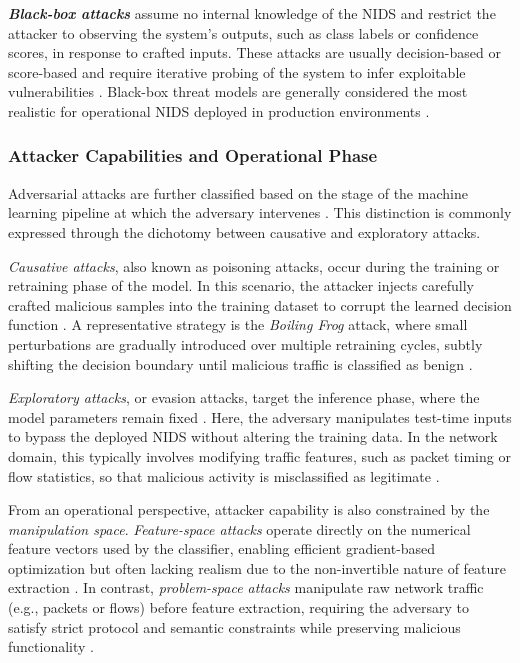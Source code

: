 \textit{\textbf{Black-box attacks}} assume no internal knowledge of the NIDS and restrict the attacker to observing the system's outputs, such as class labels or confidence scores, in response to crafted inputs. These attacks are usually decision-based or score-based and require iterative probing of the system to infer exploitable vulnerabilities \cite{yuan2024simple, zhang2022adversarial}. Black-box threat models are generally considered the most realistic for operational NIDS deployed in production environments \cite{ayub2020model}.

\subsubsection{Attacker Capabilities and Operational Phase}

Adversarial attacks are further classified based on the stage of the machine learning pipeline at which the adversary intervenes \cite{huang2011adversarial}. 
This distinction is commonly expressed through the dichotomy between causative and exploratory attacks.

\textit{Causative attacks}, also known as poisoning attacks, occur during the training or retraining phase of the model. 
In this scenario, the attacker injects carefully crafted malicious samples into the training dataset to corrupt the learned decision function \cite{rubinstein2009antidote}. 
A representative strategy is the \emph{Boiling Frog} attack, where small perturbations are gradually introduced over multiple retraining cycles, subtly shifting the decision boundary until malicious traffic is classified as benign \cite{madani2018robustness}.

\textit{Exploratory attacks}, or evasion attacks, target the inference phase, where the model parameters remain fixed \cite{huang2011adversarial}. 
Here, the adversary manipulates test-time inputs to bypass the deployed NIDS without altering the training data. 
In the network domain, this typically involves modifying traffic features, such as packet timing or flow statistics, so that malicious activity is misclassified as legitimate \cite{ayub2020model}.

From an operational perspective, attacker capability is also constrained by the \emph{manipulation space}. 
\textit{Feature-space attacks} operate directly on the numerical feature vectors used by the classifier, enabling efficient gradient-based optimization but often lacking realism due to the non-invertible nature of feature extraction \cite{han2021evaluating}. 
In contrast, \textit{problem-space attacks} manipulate raw network traffic (e.g., packets or flows) before feature extraction, requiring the adversary to satisfy strict protocol and semantic constraints while preserving malicious functionality \cite{jiang2022fgmd}.

